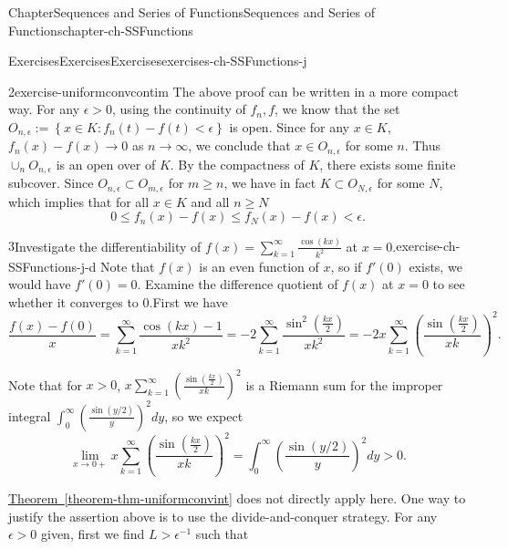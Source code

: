 \documentclass[oneside,10pt,]{book}
\newcommand{\xreffont}{\relax}
\numberwithin{equation}{section}
\begin{document}
\begin{chapterptx}{Chapter}{Sequences and Series of Functions}{}{Sequences and Series of Functions}{}{}{chapter-ch-SSFunctions}
\begin{exercises-section}{Exercises}{Exercises}{}{Exercises}{}{}{exercises-ch-SSFunctions-j}
\begin{divisionexercise}{2}{}{}{exercise-uniformconvcontim}
The above proof can be written in a more compact way. For any \(\epsilon>0\), using the continuity of \(f_{n}, f\), we know that the set \(O_{n,\epsilon}:=\left\{x\in K: f_{n}(t)-f(t) < \epsilon\right\}\) is open. Since for any \(x\in K\), \(f_{n}(x)-f(x)\to 0\) as \(n\to \infty\), we conclude that \(x\in O_{n,\epsilon}\) for some \(n\). Thus \(\cup_{n}O_{n,\epsilon}\) is an open over of \(K\). By the compactness of \(K\), there exists some finite subcover. Since \(O_{n,\epsilon} \subset O_{m,\epsilon}\) for \(m\ge n\), we have in fact \(K\subset O_{N,\epsilon}\) for some \(N\), which implies that for  all \(x\in K\) and all \(n\ge N\)%
\begin{equation*}
0\le f_{n}(x)-f(x)\le f_{N}(x) -f(x) < \epsilon\text{.}
\end{equation*}
%
\end{divisionexercise}%
\begin{divisionexercise}{3}{Investigate the differentiability of \(f(x)=\sum_{k=1}^{\infty}\frac{\cos(kx)}{k^2}\) at \(x=0\).}{}{exercise-ch-SSFunctions-j-d}%
\noindent\hypertarget{hint-ch-SSFunctions-j-d-b}{}Note that \(f(x)\) is an even function of \(x\), so if \(f'(0)\) exists, we would have \(f'(0)=0\). Examine the difference quotient of \(f(x)\) at \(x=0\)  to see whether it converges to \(0\).\noindent\hypertarget{solution-ch-SSFunctions-j-d-c}{}First we have%
\begin{equation*}
\frac{f(x)-f(0)}{x} = \sum_{k=1}^{\infty} \frac{\cos (kx) -1}{x k^2}= -2  \sum_{k=1}^{\infty} \frac{ \sin^2 (\frac{kx}{2})}{xk^2}= -2x \sum_{k=1}^{\infty} \left(  \frac{ \sin (\frac{kx}{2})}{xk}\right)^2.
\end{equation*}
%
\par
Note that for \(x>0\), \(x \sum_{k=1}^{\infty} \left(  \frac{ \sin (\frac{kx}{2})}{xk}\right)^2\) is a Riemann sum for the improper integral \(\int_0^{\infty}  \left(  \frac{ \sin (y/2) }{y} \right)^2 dy\), so we expect%
\begin{equation*}
\lim_{x\to 0+} x \sum_{k=1}^{\infty} \left(  \frac{ \sin (\frac{kx}{2})}{xk}\right)^2 = \int_0^{\infty}  \left(  \frac{ \sin (y/2) }{y} \right)^2 dy >0.
\end{equation*}
%
\par
\hyperref[theorem-thm-uniformconvint]{Theorem~{\xreffont\ref{theorem-thm-uniformconvint}}} does not directly apply here. One way to justify the assertion above is to use the divide-and-conquer strategy. For any \(\epsilon >0\) given, first we find \(L>\epsilon^{-1}\) such that%
\begin{equation*}

\end{equation*}
\end{divisionexercise}
\end{exercises-section}
\end{chapterptx}
\end{document}
